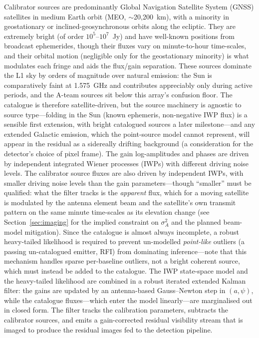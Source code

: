 \documentclass[11pt]{article}
\begin{document}
Calibrator sources are predominantly Global Navigation Satellite System (GNSS) satellites in medium Earth orbit (MEO, $\sim$20{,}200~km), with a minority in geostationary or inclined-geosynchronous orbits along the ecliptic. They are extremely bright (of order $10^5$--$10^7$~Jy) and have well-known positions from broadcast ephemerides, though their fluxes vary on minute-to-hour time-scales, and their orbital motion (negligible only for the geostationary minority) is what modulates each fringe and aids the flux/gain separation. These sources dominate the L1 sky by orders of magnitude over natural emission: the Sun is comparatively faint at 1.575~GHz and contributes appreciably only during active periods, and the A-team sources sit below this array's confusion floor. The catalogue is therefore satellite-driven, but the source machinery is agnostic to source type---folding in the Sun (known ephemeris, non-negative IWP flux) is a sensible first extension, with bright catalogued sources a later milestone---and any extended Galactic emission, which the point-source model cannot represent, will appear in the residual as a sidereally drifting background (a consideration for the detector's choice of pixel frame). The gain log-amplitudes and phases are driven by independent integrated Wiener processes (IWPs) with different driving noise levels. The calibrator source fluxes are also driven by independent IWPs, with smaller driving noise levels than the gain parameters---though ``smaller'' must be qualified: what the filter tracks is the \emph{apparent} flux, which for a moving satellite is modulated by the antenna element beam and the satellite's own transmit pattern on the same minute time-scales as its elevation change (see Section~\ref{sec:imaging} for the implied constraint on $\sigma_A^2$ and the planned beam-model mitigation). Since the catalogue is almost always incomplete, a robust heavy-tailed likelihood is required to prevent un-modelled \emph{point-like} outliers (a passing un-catalogued emitter, RFI) from dominating inference---note that this mechanism handles sparse per-baseline outliers, not a bright coherent source, which must instead be added to the catalogue. The IWP state-space model and the heavy-tailed likelihood are combined in a robust iterated extended Kalman filter: the gains are updated by an antenna-based Gauss--Newton step in $(a,\psi)$, while the catalogue fluxes---which enter the model linearly---are marginalised out in closed form. The filter tracks the calibration parameters, subtracts the calibrator sources, and emits a gain-corrected residual visibility stream that is imaged to produce the residual images fed to the detection pipeline.
\end{document}
